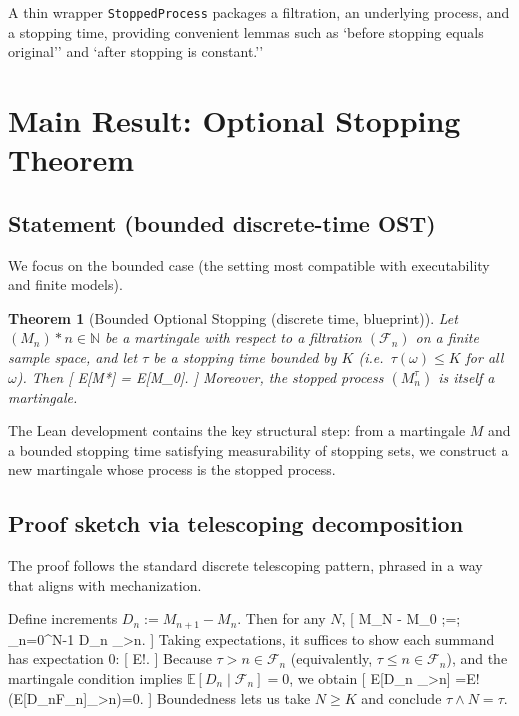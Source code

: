 \documentclass[11pt]{article}
\newtheorem{theorem}{Theorem}
\begin{document}
A thin wrapper \texttt{StoppedProcess} packages a filtration, an underlying process, and a stopping time, providing convenient lemmas such as `before stopping equals original'' and `after stopping is constant.'' %

\section{Main Result: Optional Stopping Theorem}

\subsection{Statement (bounded discrete-time OST)}

We focus on the bounded case (the setting most compatible with executability and finite models).

\begin{theorem}[Bounded Optional Stopping (discrete time, blueprint)]
Let $(M_n)*{n\in\mathbb N}$ be a martingale with respect to a filtration $(\mathcal F_n)$ on a finite sample space, and let $\tau$ be a stopping time bounded by $K$ (i.e.\ $\tau(\omega)\le K$ for all $\omega$). Then
[
\mathbb E[M*{\tau}] = \mathbb E[M_0].
]
Moreover, the stopped process $(M^{\tau}_n)$ is itself a martingale.
\end{theorem}

The Lean development contains the key structural step: from a martingale $M$ and a bounded stopping time satisfying measurability of stopping sets, we construct a new martingale whose process is the stopped process. %

\subsection{Proof sketch via telescoping decomposition}

The proof follows the standard discrete telescoping pattern, phrased in a way that aligns with mechanization.

Define increments $D_n := M_{n+1}-M_n$. Then for any $N$,
[
M_{\tau\wedge N} - M_0 ;=; \sum_{n=0}^{N-1} D_n \cdot {}_{{\tau>n}}.
]
Taking expectations, it suffices to show each summand has expectation $0$:
[
\mathbb E!.
]
Because ${\tau>n}\in\mathcal F_n$ (equivalently, ${\tau\le n}\in\mathcal F_n$), and the martingale condition implies $\mathbb E[D_n\mid \mathcal F_n]=0$, we obtain
[
\mathbb E[D_n \cdot {}_{{\tau>n}}]
=\mathbb E!\left(\mathbb E[D_n\mid \mathcal F_n]\cdot {}_{{\tau>n}}\right)=0.
]
Boundedness lets us take $N\ge K$ and conclude $\tau\wedge N=\tau$.
\end{document}
